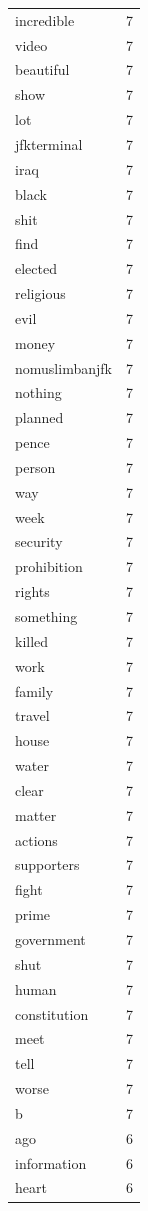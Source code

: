 \begin{tabular}{lr}
incredible & 7 \\
video & 7 \\
beautiful & 7 \\
show & 7 \\
lot & 7 \\
jfkterminal & 7 \\
iraq & 7 \\
black & 7 \\
shit & 7 \\
find & 7 \\
elected & 7 \\
religious & 7 \\
evil & 7 \\
money & 7 \\
nomuslimbanjfk & 7 \\
nothing & 7 \\
planned & 7 \\
pence & 7 \\
person & 7 \\
way & 7 \\
week & 7 \\
security & 7 \\
prohibition & 7 \\
rights & 7 \\
something & 7 \\
killed & 7 \\
work & 7 \\
family & 7 \\
travel & 7 \\
house & 7 \\
water & 7 \\
clear & 7 \\
matter & 7 \\
actions & 7 \\
supporters & 7 \\
fight & 7 \\
prime & 7 \\
government & 7 \\
shut & 7 \\
human & 7 \\
constitution & 7 \\
meet & 7 \\
tell & 7 \\
worse & 7 \\
b & 7 \\
ago & 6 \\
information & 6 \\
heart & 6 \\

\end{tabular}
